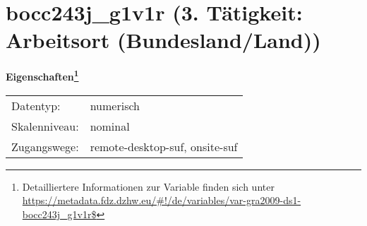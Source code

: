 
    \setcounter{footnote}{0}

    \vspace*{-1.8cm}
	\section{bocc243j\_g1v1r (3. Tätigkeit: Arbeitsort (Bundesland/Land))}
	\label{section:bocc243j_g1v1r}



    \vspace*{0.5cm}
    \noindent\textbf{Eigenschaften\footnote{Detailliertere Informationen zur Variable finden sich unter
		\url{https://metadata.fdz.dzhw.eu/\#!/de/variables/var-gra2009-ds1-bocc243j_g1v1r$}}}\\
	\begin{tabularx}{\hsize}{@{}lX}
	Datentyp: & numerisch \\
	Skalenniveau: & nominal \\
	Zugangswege: &
	  remote-desktop-suf, 
	  onsite-suf
 \\
    \end{tabularx}



